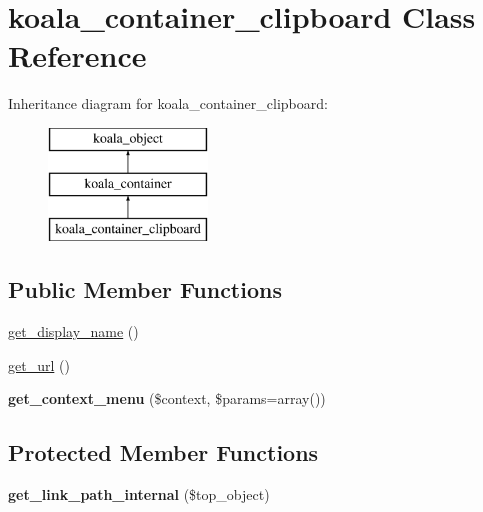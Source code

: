 \hypertarget{classkoala__container__clipboard}{
\section{koala\_\-container\_\-clipboard Class Reference}
\label{classkoala__container__clipboard}
}
Inheritance diagram for koala\_\-container\_\-clipboard:\begin{figure}[H]
\begin{center}
\leavevmode
\includegraphics[height=3.000000cm]{classkoala__container__clipboard}
\end{center}
\end{figure}
\subsection*{Public Member Functions}
\begin{DoxyCompactItemize}
\item 
\hyperlink{classkoala__container__clipboard_ac898df4ea14c9892745e3ddedde86206}{get\_\-display\_\-name} ()
\item 
\hyperlink{classkoala__container__clipboard_a86dfe086c44158395383477b15f6c8e2}{get\_\-url} ()
\item 
\hypertarget{classkoala__container__clipboard_adc807ea8cd391f34a5b1796e0c4c412c}{
{\bfseries get\_\-context\_\-menu} (\$context, \$params=array())}
\label{classkoala__container__clipboard_adc807ea8cd391f34a5b1796e0c4c412c}

\end{DoxyCompactItemize}
\subsection*{Protected Member Functions}
\begin{DoxyCompactItemize}
\item 
\hypertarget{classkoala__container__clipboard_a3b7aa5e7928dbc4354e5971d9247b5d0}{
{\bfseries get\_\-link\_\-path\_\-internal} (\$top\_\-object)}
\label{classkoala__container__clipboard_a3b7aa5e7928dbc4354e5971d9247b5d0}

\end{DoxyCompactItemize}


